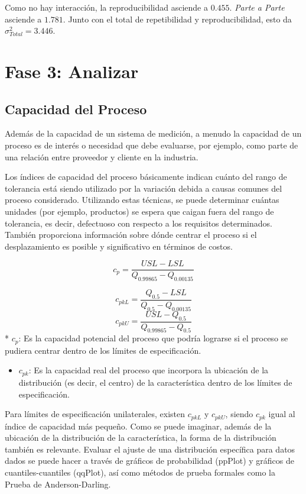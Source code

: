 \documentclass[
]{book}
\providecommand{\tightlist}{%
  \setlength{\itemsep}{0pt}\setlength{\parskip}{0pt}}
\begin{document}
Como no hay interacción, la reproducibilidad asciende a \(0.455\). \emph{Parte a Parte} asciende a \(1.781\). Junto con el total de repetibilidad y reproducibilidad, esto da \(\sigma^2_{Total} = 3.446\).

\hypertarget{fase-3-analizar}{%
\section{Fase 3: Analizar}\label{fase-3-analizar}}

\hypertarget{capacidad-del-proceso}{%
\subsection{Capacidad del Proceso}\label{capacidad-del-proceso}}

Además de la capacidad de un sistema de medición, a menudo la capacidad de un proceso es de interés o necesidad que debe evaluarse, por ejemplo, como parte de una relación entre proveedor y cliente en la industria.

Los índices de capacidad del proceso básicamente indican cuánto del rango de tolerancia está siendo utilizado por la variación debida a causas comunes del proceso considerado. Utilizando estas técnicas, se puede determinar cuántas unidades (por ejemplo, productos) se espera que caigan fuera del rango de tolerancia, es decir, defectuoso con respecto a los requisitos determinados. También proporciona información sobre dónde centrar el proceso si el desplazamiento es posible y significativo en términos de costos.

\[
c_p = \frac{USL - LSL}{Q_{0.99865} - Q_{0.00135}}
\]

\[
c_{pkL} = \frac{Q_{0.5} - LSL}{Q_{0.5} - Q_{0.00135}}
\]
\[
c_{pkU} = \frac{USL - Q_{0.5}}{Q_{0.99865} - Q_{0.5}}
\]
* \(c_p\): Es la capacidad potencial del proceso que podría lograrse si el proceso se pudiera centrar dentro de los límites de especificación.

\begin{itemize}
\tightlist
\item
  \(c_{pk}\): Es la capacidad real del proceso que incorpora la ubicación de la distribución (es decir, el centro) de la característica dentro de los límites de especificación.
\end{itemize}

Para límites de especificación unilaterales, existen \(c_{pkL}\) y \(c_{pkU}\), siendo \(c_{pk}\) igual al índice de capacidad más pequeño. Como se puede imaginar, además de la ubicación de la distribución de la característica, la forma de la distribución también es relevante. Evaluar el ajuste de una distribución específica para datos dados se puede hacer a través de gráficos de probabilidad (ppPlot) y gráficos de cuantiles-cuantiles (qqPlot), así como métodos de prueba formales como la Prueba de Anderson-Darling.
\end{document}
